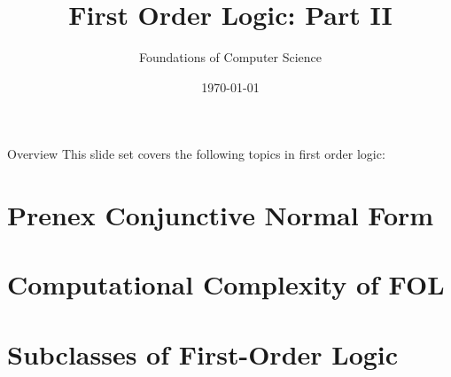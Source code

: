 \documentclass[style=sailor,size=12pt]{powerdot}
\title{First Order Logic: Part II}
\author{Foundations of Computer Science}
\date{\today}
\begin{document}
\maketitle
\begin{slide}[toc=,bm=]{Overview}
This slide set covers the following topics in first order logic:

\vspace{5mm}
\tableofcontents[content=sections]
\end{slide}

\section[]{Prenex Conjunctive Normal Form}


\section[]{Computational Complexity of FOL}


\section[]{Subclasses of First-Order Logic}

\end{document}
